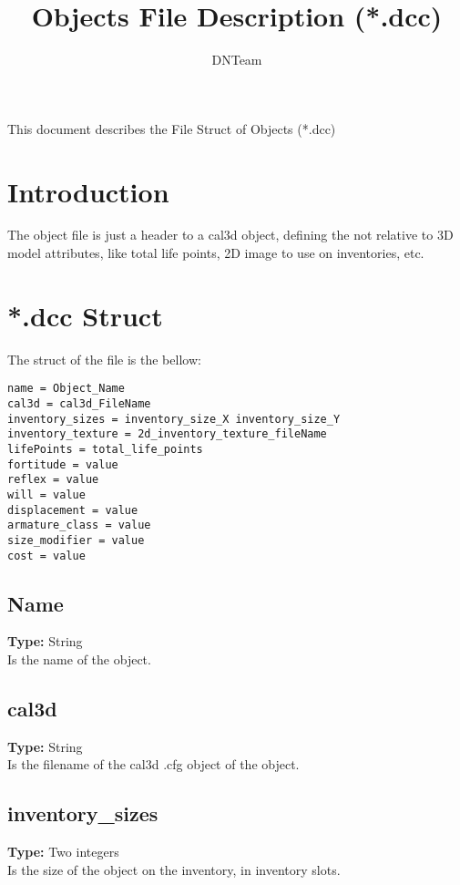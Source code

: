 \documentclass[letterpaper,12pt]{article}
\begin{document}
\title{Objects File Description (*.dcc)}

\author{
DNTeam
}

\maketitle

\abstract
{
   \begin{center}
      This document describes the File Struct of Objects (*.dcc)
   \end{center}
}

\newpage

\tableofcontents

\newpage


\section{Introduction}

The object file is just a header to a cal3d object, defining the not relative
to 3D model attributes, like total life points, 2D image to use on inventories,
etc.

\section{*.dcc Struct}

The struct of the file is the bellow:

\begin{verbatim}
name = Object_Name
cal3d = cal3d_FileName
inventory_sizes = inventory_size_X inventory_size_Y
inventory_texture = 2d_inventory_texture_fileName
lifePoints = total_life_points
fortitude = value
reflex = value
will = value
displacement = value
armature_class = value
size_modifier = value
cost = value
\end{verbatim}

\subsection{Name}
{\bf Type:} String\\
Is the name of the object.

\subsection{cal3d}
{\bf Type:} String\\
Is the filename of the cal3d .cfg object of the object.

\subsection{inventory\_sizes}
{\bf Type:} Two integers\\
Is the size of the object on the inventory, in inventory slots.
\end{document}
